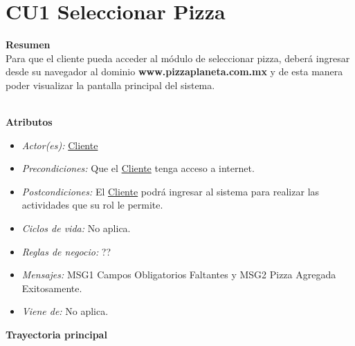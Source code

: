 
\pagebreak
\hypertarget{CU1}{}
\section{CU1 Seleccionar Pizza}

	\noindent \textbf{Resumen}\\

		Para que el cliente pueda acceder al módulo de seleccionar pizza, deberá ingresar desde su navegador al dominio {\textbf{www.pizzaplaneta.com.mx}} y de esta manera poder visualizar la pantalla principal del sistema.

	\noindent \textbf{\\Atributos}

		\begin{itemize}

			\item \textit{Actor(es):} \hyperlink{A:Cliente}{Cliente}
			\item \textit{Precondiciones:} Que el \hyperlink{A:Cliente}{Cliente} tenga acceso a internet. 
			\item \textit{Postcondiciones:} El \hyperlink{A:Cliente}{Cliente} podrá ingresar al sistema para realizar las actividades que su rol le permite.
			\item \textit{Ciclos de vida:} No aplica.
			\item \textit{Reglas de negocio:} ??
			\item \textit{Mensajes:} MSG1 Campos Obligatorios Faltantes y MSG2 Pizza Agregada Exitosamente.
			\item \textit{Viene de:} No aplica.

		\end{itemize} 

	\noindent \textbf{Trayectoria principal}

